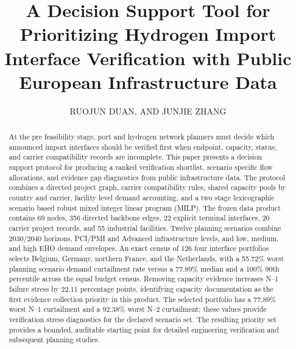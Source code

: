 \documentclass{ieeeaccess}
\begin{document}
\doi{}

\title{A Decision Support Tool for Prioritizing Hydrogen Import Interface Verification with Public European Infrastructure Data}

\author{\uppercase{Ruojun Duan}, AND \uppercase{Junjie Zhang}}

\address[1]{School of Political Science and International Relations, Tongji University, Shanghai 200092, China (e-mail: duanruojun@tongji.edu.cn)}
\address[2]{Shanghai Academy of Global Governance \& Area Studies, Shanghai International Studies University, Shanghai 201620, China (e-mail: junjiezhang2024@shisu.edu.cn)}
\address[3]{School of Economics and Finance, Shanghai International Studies University, Shanghai 201620, China}



\begin{abstract}
At the pre feasibility stage, port and hydrogen network planners must decide which announced import interfaces should be verified first when endpoint, capacity, status, and carrier compatibility records are incomplete. This paper presents a decision support protocol for producing a ranked verification shortlist, scenario specific flow allocations, and evidence gap diagnostics from public infrastructure data. The protocol combines a directed project graph, carrier compatibility rules, shared capacity pools by country and carrier, facility level demand accounting, and a two stage lexicographic scenario based robust mixed integer linear program (MILP). The frozen data product contains 69 nodes, 356 directed backbone edges, 22 explicit terminal interfaces, 20 carrier project records, and 55 industrial facilities. Twelve planning scenarios combine 2030/2040 horizons, PCI/PMI and Advanced infrastructure levels, and low, medium, and high EHO demand envelopes. An exact census of 126 four interface portfolios selects Belgium, Germany, northern France, and the Netherlands, with a 55.72\% worst planning scenario demand curtailment rate versus a 77.89\% median and a 100\% 90th percentile across the equal budget census. Removing capacity evidence increases N--1 failure stress by 22.11 percentage points, identifying capacity documentation as the first evidence collection priority in this product. The selected portfolio has a 77.89\% worst N--1 curtailment and a 92.38\% worst N--2 curtailment; these values provide verification stress diagnostics for the declared scenario set. The resulting priority set provides a bounded, auditable starting point for detailed engineering verification and subsequent planning studies.
\end{abstract}
\end{document}
